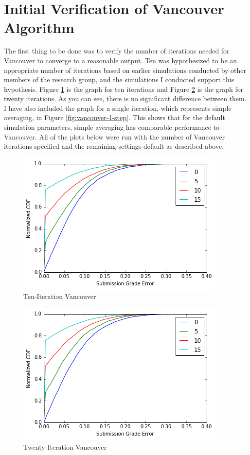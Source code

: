 \documentclass{article}
\begin{document}
	\section{Initial Verification of Vancouver Algorithm}
	The first thing to be done was to verify the number of iterations needed for Vancouver to converge to a reasonable output. Ten was hypothesized to be an appropriate number of iterations based on earlier simulations conducted by other members of the research group, and the simulations I conducted support this hypothesis. Figure \ref{fig:vancouver-10-steps} is the graph for ten iterations and Figure \ref{fig:vancouver-20-steps} is the graph for twenty iterations. As you can see, there is no significant difference between them. I have also included the graph for a single iteration, which represents simple averaging, in Figure \ref{fig:vancouver-1-step}. This shows that for the default simulation parameters, simple averaging has comparable performance to Vancouver. All of the plots below were run with the number of Vancouver iterations specified and the remaining settings default as described above.

	\begin{figure}[h]
		\includegraphics{vancouver-10-steps.png}
		\caption{Ten-Iteration Vancouver}
		\label{fig:vancouver-10-steps}
	\end{figure}
	
	\begin{figure}[h]
		\includegraphics{vancouver-20-steps.png}
		\caption{Twenty-Iteration Vancouver}
		\label{fig:vancouver-20-steps}
	\end{figure}
	
\end{document}
